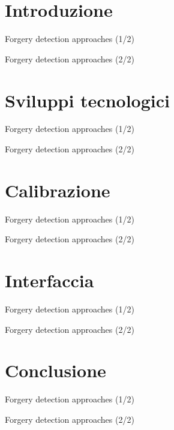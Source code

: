 \section{Introduzione}
\begin{frame}{Forgery detection approaches (1/2)}
\end{frame}
\begin{frame}{Forgery detection approaches (2/2)}
\end{frame}

\section{Sviluppi tecnologici}
\begin{frame}{Forgery detection approaches (1/2)}
\end{frame}
\begin{frame}{Forgery detection approaches (2/2)}
\end{frame}

\section{Calibrazione}
\begin{frame}{Forgery detection approaches (1/2)}
\end{frame}
\begin{frame}{Forgery detection approaches (2/2)}
\end{frame}

\section{Interfaccia}
\begin{frame}{Forgery detection approaches (1/2)}
\end{frame}
\begin{frame}{Forgery detection approaches (2/2)}
\end{frame}

\section{Conclusione}
\begin{frame}{Forgery detection approaches (1/2)}
\end{frame}
\begin{frame}{Forgery detection approaches (2/2)}
\end{frame}
